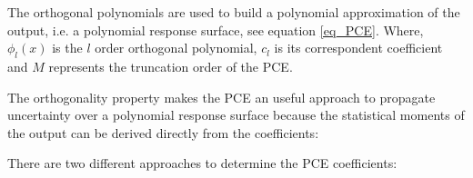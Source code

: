 \documentclass[preprint,12pt]{elsarticle}
\begin{document}




The orthogonal polynomials are used to build a polynomial approximation of the output, i.e. a polynomial response surface, see equation \ref{eq_PCE}. Where, $\phi_{l} (x)$ is the $l$ order orthogonal polynomial, $c_l$ is its correspondent coefficient and $M$ represents the truncation order of the PCE.


The orthogonality property makes the PCE an useful approach to propagate uncertainty over a polynomial response surface because the statistical moments of the output can be derived directly from the coefficients:





There are two different approaches to determine the PCE coefficients:
\end{document}
